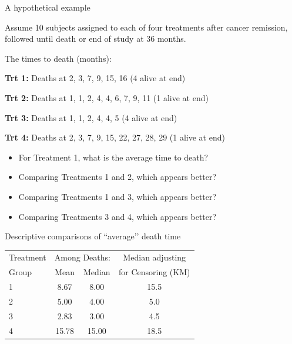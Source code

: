 \documentclass[ignorenonframetext,]{beamer}
\providecommand{\tightlist}{%
  \setlength{\itemsep}{0pt}\setlength{\parskip}{0pt}}
\begin{document}
\begin{frame}{%
\protect\hypertarget{a-hypothetical-example}{%
A hypothetical example}}

Assume 10 subjects assigned to each of four treatments after cancer
remission, followed until death or end of study at 36 months.

The times to death (months):

\textbf{Trt 1:} Deaths at 2, 3, 7, 9, 15, 16 (4 alive at end)

\textbf{Trt 2:} Deaths at 1, 1, 2, 4, 4, 6, 7, 9, 11 (1 alive at end)

\textbf{Trt 3:} Deaths at 1, 1, 2, 4, 4, 5 (4 alive at end)

\textbf{Trt 4:} Deaths at 2, 3, 7, 9, 15, 22, 27, 28, 29 (1 alive at
end)

\begin{itemize}
\tightlist
\item
  For Treatment 1, what is the average time to death?
\item
  Comparing Treatments 1 and 2, which appears better?
\item
  Comparing Treatments 1 and 3, which appears better?
\item
  Comparing Treatments 3 and 4, which appears better?
\end{itemize}

\end{frame}

\begin{frame}{%
\protect\hypertarget{descriptive-comparisons-of-average-death-time}{%
Descriptive comparisons of ``average’’ death time}}

\begin{tabular}{lccc}
\hline
Treatment & \multicolumn{2}{c}{Among Deaths:} & Median adjusting \\
\cline{2-3} 
 Group & Mean & Median & for Censoring (KM) \\ \hline
1 & 8.67 & 8.00 & 15.5\\
2 & 5.00 & 4.00 & 5.0 \\
3 & 2.83 & 3.00 & 4.5 \\
4 & 15.78 & 15.00 & 18.5\\ \hline
\end{tabular}

\end{frame}
\end{document}

